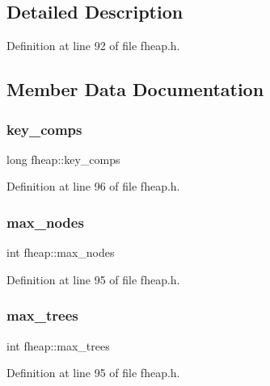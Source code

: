\subsection{Detailed Description}


Definition at line 92 of file fheap.\+h.



\subsection{Member Data Documentation}
\mbox{\label{structfheap_ab593aa07617376fafd3d1c378d5d73d9}} 
\subsubsection{\texorpdfstring{key\+\_\+comps}{key\_comps}}
{\footnotesize\ttfamily long fheap\+::key\+\_\+comps}



Definition at line 96 of file fheap.\+h.

\mbox{\label{structfheap_a05a5bfb7e168b7aacb49e998a87f4d6f}} 
\subsubsection{\texorpdfstring{max\+\_\+nodes}{max\_nodes}}
{\footnotesize\ttfamily int fheap\+::max\+\_\+nodes}



Definition at line 95 of file fheap.\+h.

\mbox{\label{structfheap_a496e0271cc82f25d8c53588b7982954b}} 
\subsubsection{\texorpdfstring{max\+\_\+trees}{max\_trees}}
{\footnotesize\ttfamily int fheap\+::max\+\_\+trees}



Definition at line 95 of file fheap.\+h.

\mbox{\label{structfheap_af369ea8f1202800c582fe570803fea9f}} 
